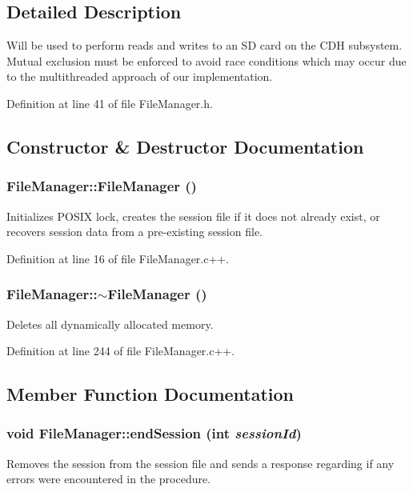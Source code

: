 \subsection{Detailed Description}
Will be used to perform reads and writes to an SD card on the CDH subsystem. Mutual exclusion must be enforced to avoid race conditions which may occur due to the multithreaded approach of our implementation. 

Definition at line 41 of file FileManager.h.



\subsection{Constructor \& Destructor Documentation}
\hypertarget{class_file_manager_a8afd512c06be9daf140cc19d71f9b391}{
\subsubsection[{FileManager}]{\setlength{\rightskip}{0pt plus 5cm}FileManager::FileManager ()}}
\label{class_file_manager_a8afd512c06be9daf140cc19d71f9b391}
Initializes POSIX lock, creates the session file if it does not already exist, or recovers session data from a pre-\/existing session file. 

Definition at line 16 of file FileManager.c++.

\hypertarget{class_file_manager_abaed33b5b0c13b8a597db9335a1aacfa}{
\subsubsection[{$\sim$FileManager}]{\setlength{\rightskip}{0pt plus 5cm}FileManager::$\sim$FileManager ()}}
\label{class_file_manager_abaed33b5b0c13b8a597db9335a1aacfa}
Deletes all dynamically allocated memory. 

Definition at line 244 of file FileManager.c++.



\subsection{Member Function Documentation}
\hypertarget{class_file_manager_a789e8afe9bb1d763e86e9bb97c48bff2}{
\subsubsection[{endSession}]{\setlength{\rightskip}{0pt plus 5cm}void FileManager::endSession (int {\em sessionId})}}
\label{class_file_manager_a789e8afe9bb1d763e86e9bb97c48bff2}
Removes the session from the session file and sends a response regarding if any errors were encountered in the procedure. 

